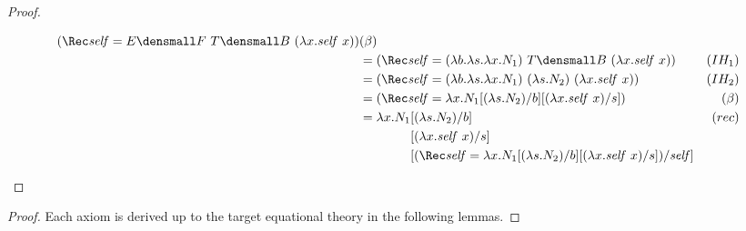 \begin{proof}
\begin{enumerate}[(a)]
\begin{itemize}
\begin{align*}
        (\Rec \mathit{self} = E\den{F} ~ T\den{B} ~ (\lambda x. \mathit{self} ~ x))
        &(\beta)
        \\
        &=
        (\Rec \mathit{self}
        = (\lambda b. \lambda s. \lambda x. N_1)
        ~ T\den{B}
        ~ (\lambda x. \mathit{self} ~ x))
        &(IH_1)
        \\
        &=
        (\Rec \mathit{self}
        = (\lambda b. \lambda s. \lambda x. N_1)
        ~ (\lambda s. N_2)
        ~ (\lambda x. \mathit{self} ~ x))
        &(IH_2)
        \\
        &=
        (\Rec \mathit{self}
        = \lambda x.N_1\subst{b}{(\lambda s.N_2)}\subst{s}{(\lambda x.\mathit{self}~x)})
        &(\beta)
        \\
        &=
        \begin{aligned}[t]
          \lambda x.
          N_1
          &\subst{b}{(\lambda s.N_2)}
          \\
          &\subst{s}{(\lambda x.\mathit{self}~x)}
          \\
          &\subst
          {\mathit{self}}
          {
            (\Rec \mathit{self}
            =
            \lambda x.N_1\subst{b}{(\lambda s.N_2)}\subst{s}{(\lambda x.\mathit{self}~x)})
          }
        \end{aligned}
        &(rec)
      \end{align*}
    \end{itemize}
  \end{enumerate}
\end{proof}

\thmsoundness*
\begin{proof}
  Each axiom is derived up to the target equational theory in the following lemmas.
\end{proof}

